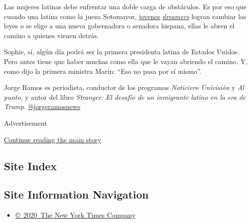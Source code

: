 Las mujeres latinas debe enfrentar una doble carga de obstáculos. Es por
eso que cuando una latina como la jueza Sotomayor,
\href{https://www.nytimes.com/es/2020/06/20/espanol/opinion/dreamers-suprema-corte-daca.html}{jovenes}
\href{https://www.nytimes.com/es/2020/06/20/espanol/opinion/dreamers-suprema-corte-daca.html}{\emph{dreamers}}
logran cambiar las leyes o se elige a una nueva gobernadora o senadora
hispana, ellas le abren el camino a quienes vienen detrás.

Sophie, sí, algún día podrá ser la primera presidenta latina de Estados
Unidos. Pero antes tiene que haber muchas como ella que le vayan
abriendo el camino. Y, como dijo la primera ministra Marin: ``Eso no
pasa por sí mismo''.

Jorge Ramos es periodista, conductor de los programas \emph{Noticiero
Univisión} y \emph{Al punto,} y autor del libro \emph{Stranger: El
desafío de un inmigrante latino en la era de Trump}.
\href{https://twitter.com/jorgeramosnews}{@jorgeramosnews}

Advertisement

\protect\hyperlink{after-bottom}{Continue reading the main story}

\hypertarget{site-index}{%
\subsection{Site Index}\label{site-index}}

\hypertarget{site-information-navigation}{%
\subsection{Site Information
Navigation}\label{site-information-navigation}}

\begin{itemize}
\tightlist
\item
  \href{https://help.nytimes.com/hc/en-us/articles/115014792127-Copyright-notice}{©~2020~The
  New York Times Company}
\end{itemize}

